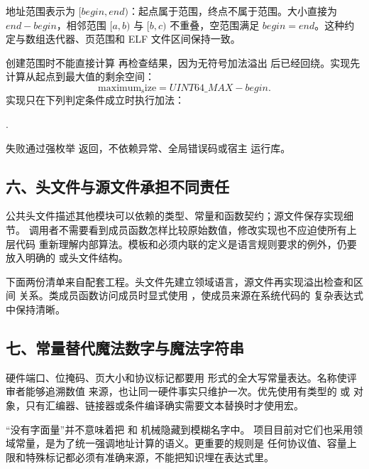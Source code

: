 地址范围表示为 \([begin,end)\)：起点属于范围，终点不属于范围。大小直接为
\(end-begin\)，相邻范围 \([a,b)\) 与 \([b,c)\) 不重叠，空范围满足
\(begin=end\)。这种约定与数组迭代器、页范围和 ELF 文件区间保持一致。

创建范围时不能直接计算  再检查结果，因为无符号加法溢出
后已经回绕。实现先计算从起点到最大值的剩余空间：
\[
  \mathrm{maximum_size}=UINT64\_MAX-begin.
\]
实现只在下列判定条件成立时执行加法：
\begin{center}
  .
\end{center}
失败通过强枚举
 返回，不依赖异常、全局错误码或宿主
运行库。

\subsection{六、头文件与源文件承担不同责任}

公共头文件描述其他模块可以依赖的类型、常量和函数契约；源文件保存实现细节。
调用者不需要看到成员函数怎样比较原始数值，修改实现也不应迫使所有上层代码
重新理解内部算法。模板和必须内联的定义是语言规则要求的例外，仍要放入明确的
 或头文件结构。

下面两份清单来自配套工程。头文件先建立领域语言，源文件再实现溢出检查和区间
关系。类成员函数访问成员时显式使用 ，使成员来源在系统代码的
复杂表达式中保持清晰。





\subsection{七、常量替代魔法数字与魔法字符串}

硬件端口、位掩码、页大小和协议标记都要用
 形式的全大写常量表达。名称使评审者能够追溯数值
来源，也让同一硬件事实只维护一次。优先使用有类型的  或
 对象，只有汇编器、链接器或条件编译确实需要文本替换时才使用宏。

“没有字面量”并不意味着把  和  机械隐藏到模糊名字中。
项目目前对它们也采用领域常量，是为了统一强调地址计算的语义。更重要的规则是
任何协议值、容量上限和特殊标记都必须有准确来源，不能把知识埋在表达式里。

